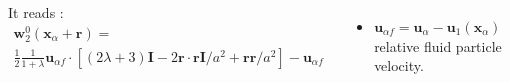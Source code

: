 \documentclass{sintefbeamer}
\begin{document}
\begin{frame}
\begin{columns}
    It reads : 
    \begin{multline*}
        \textbf{w}_2^0(\textbf{x}_\alpha + \textbf{r}) = \\
        \frac{1}{2}\frac{1}{1+\lambda} \textbf{u}_{\alpha f}\cdot \left[
            (2\lambda+3)\textbf{I}
            - 2 \textbf{r}\cdot \textbf{r} \textbf{I}/a^2
            + \textbf{rr}/a^2
        \right] - \textbf{u}_{\alpha f}
    \end{multline*}

    \begin{itemize}
      \item $\textbf{u}_{\alpha f} = \textbf{u}_\alpha - \textbf{u}_1(\textbf{x}_\alpha)$ relative fluid particle velocity. 
    \end{itemize}
  \end{columns}

\end{frame}
\end{document}
